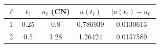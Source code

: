 \begin{tabular}{ccccc}
\toprule
$\ell$ & $t_\ell$ & $u_\ell$ (CN) & $u(t_\ell)$ & $|u(t_\ell)-u_\ell|$ \\
\midrule
1 & 0.25 & 0.8 & 0.786939 & 0.0130613 \\
2 & 0.5 & 1.28 & 1.26424 & 0.0157589 \\
\bottomrule
\end{tabular}
